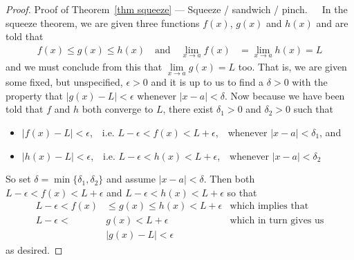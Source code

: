 \begin{proof}{Proof of Theorem~\ref{thm squeeze} --- Squeeze / sandwich / pinch.}\ \ \
In the squeeze theorem, we are given three functions $f(x)$, $g(x)$ and $h(x)$
and are told that
\begin{align*}
    f(x) \leq g(x) \leq h(x) \quad\text{and}\quad
    \lim_{x \to a} f(x) &= \lim_{x \to a} h(x) = L
\end{align*}
and we must conclude from this that $\lim\limits_{x \to a} g(x) = L$ too.
That is, we are given some fixed, but unspecified, $\epsilon>0$
and it is up to us to find a $\delta>0$ with the property that
$\left| g(x) - L \right|<\epsilon$ whenever $|x-a|<\delta$. Now because we have been told that $f$ and $h$ both converge to $L$, there exist $\delta_1>0$ and
$\delta_2>0$ such that
\begin{itemize}
 \item $\left| f(x) - L \right|<\epsilon$,\ \
           i.e. $L-\epsilon<f(x)<L+\epsilon$,\ \
           whenever $|x-a|<\delta_1$, and
 \item $\left| h(x) - L \right|<\epsilon$,\ \
           i.e. $L-\epsilon<h(x)<L+\epsilon$,\ \
           whenever $|x-a|<\delta_2$
\end{itemize}
So set $\delta = \min\{\delta_1,\delta_2\}$ and assume $|x-a|<\delta$. Then
both $L-\epsilon<f(x)<L+\epsilon$ and $L-\epsilon<h(x)<L+\epsilon$ so that
\begin{align*}
L-\epsilon<f(x) &\le g(x) \le h(x) < L+\epsilon & \text{which implies that}\\
L-\epsilon< & g(x) < L+\epsilon & \text{which in turn gives us}\\
&\left| g(x) - L \right|<\epsilon
\end{align*}
as desired.
\end{proof}

